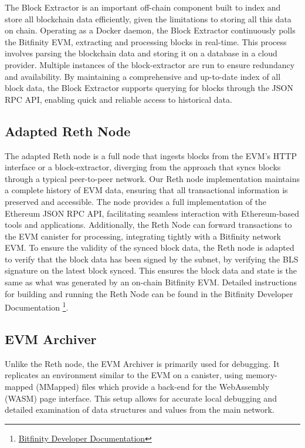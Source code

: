 \documentclass{article}
\begin{document}
The Block Extractor is an important off-chain component built to index and store all blockchain data efficiently, given the limitations to storing all this data on chain. Operating as a Docker daemon, the Block Extractor continuously polls the Bitfinity EVM, extracting and processing blocks in real-time. This process involves parsing the blockchain data and storing it on a database in a cloud provider. Multiple instances of the block-extractor are run to ensure redundancy and availability. By maintaining a comprehensive and up-to-date index of all block data, the Block Extractor supports querying for blocks through the JSON RPC API, enabling quick and reliable access to historical data. 

\subsection{Adapted Reth Node}

The adapted Reth node is a full node that ingests blocks from the EVM's HTTP interface or a block-extractor, diverging from the approach that syncs blocks through a typical peer-to-peer network. Our  Reth node implementation maintains a complete history of EVM data, ensuring that all transactional information is preserved and accessible. The node provides a full implementation of the Ethereum JSON RPC API, facilitating seamless interaction with Ethereum-based tools and applications. Additionally, the Reth Node can forward transactions to the EVM canister for processing, integrating tightly with a Bitfinity network EVM. 
To ensure the validity of the synced block data, the Reth node is adapted to verify that the block data has been signed by the subnet, by verifying the BLS signature on the latest block synced. This ensures the block data and state is the same as what was generated by an on-chain Bitfinity EVM. Detailed instructions for building and running the Reth Node can be found in the Bitfinity Developer Documentation \footnote{\href{https://github.com/bitfinity-network/reth/blob/bitfinity-archive-node/bitfinity.md}{Bitfinity Developer Documentation}}. 

\subsection{EVM Archiver}

Unlike the Reth node, the EVM Archiver is primarily used for debugging. It replicates an environment similar to the EVM on a canister, using memory-mapped (MMapped) files which provide a back-end for the WebAssembly (WASM) page interface. This setup allows for accurate local debugging and detailed examination of data structures and values from the main network.
\end{document}
